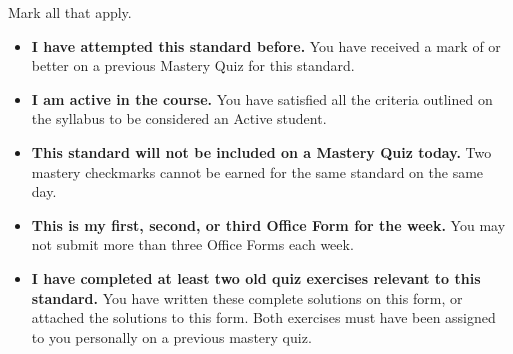 \documentclass[12pt]{article}
\newcommand{\issuesMark}{{\fontencoding{U}\fontfamily{futs}\selectfont\char 66\relax}}
\begin{document}

\vspace{1em}



\renewcommand\labelitemi{\(\square\)}
Mark all that apply.
\begin{itemize}
  \item \textbf{I have attempted this standard before.}
        You have received a mark of \issuesMark{} or better on a previous Mastery Quiz
        for this standard.
  \item \textbf{I am active in the course.}
        You have satisfied all the criteria outlined on the syllabus to be
        considered an Active student.
  \item \textbf{This standard will not be included on a Mastery Quiz today.}
        Two mastery checkmarks cannot be earned for the same standard on the same day.
  \item \textbf{This is my first, second, or third Office Form for the week.}
        You may not submit more than three Office Forms each week.
  \item \textbf{I have completed at least two old quiz exercises
        relevant to this standard.}
        You have written these complete solutions on this form, or attached the solutions
        to this form. Both exercises must have been assigned to you personally
        on a previous mastery quiz.
\end{itemize}
\end{document}
